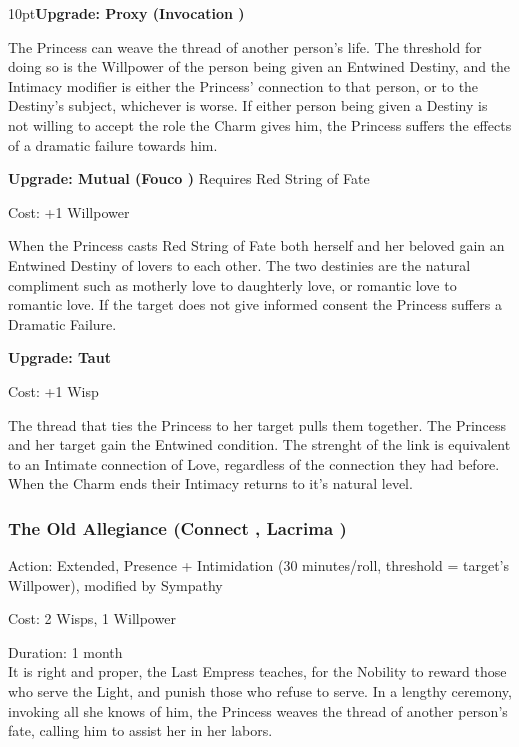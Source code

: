 \begin{myindentpar}{10pt}\textbf{Upgrade: Proxy (Invocation \textbullet\textbullet\textbullet\textbullet)}

The Princess can weave the thread of another person's life. The threshold for doing so is the Willpower of the person being given an Entwined Destiny, and the Intimacy modifier is either the Princess' connection to that person, or to the Destiny's subject, whichever is worse. If either person being given a Destiny is not willing to accept the role the Charm gives him, the Princess suffers the effects of a dramatic failure towards him.

\textbf{Upgrade: Mutual (Fouco \textbullet\textbullet\textbullet\textbullet)}
\noindent Requires Red String of Fate

\noindent Cost: +1 Willpower

When the Princess casts Red String of Fate both herself and her beloved gain an Entwined Destiny of lovers to each other. The two destinies are the natural compliment such as motherly love to daughterly love, or romantic love to romantic love. If the target does not give informed consent the Princess suffers a Dramatic Failure.

\textbf{Upgrade: Taut}

\noindent Cost: +1 Wisp

The thread that ties the Princess to her target pulls them together. The Princess and her target gain the Entwined condition. The strenght of the link is equivalent to an Intimate connection of Love, regardless of the connection they had before. When the Charm ends their Intimacy returns to it's natural level.
\end{myindentpar}


\subsubsection*{The Old Allegiance (Connect \textbullet\textbullet\textbullet\textbullet, Lacrima \textbullet\textbullet\textbullet)}

\noindent Action: Extended, Presence + Intimidation (30 minutes/roll, threshold = target's Willpower), modified by Sympathy

\noindent Cost: 2 Wisps, 1 Willpower

\noindent Duration: 1 month\\

\noindent It is right and proper, the Last Empress teaches, for the Nobility to reward those who serve the Light, and punish those who refuse to serve. In a lengthy ceremony, invoking all she knows of him, the Princess weaves the thread of another person's fate, calling him to assist her in her labors.

